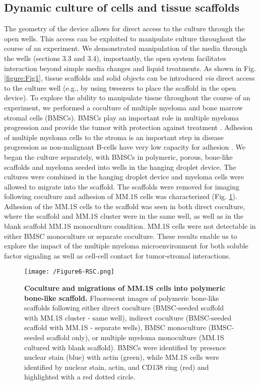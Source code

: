 \subsection{Dynamic culture of cells and tissue scaffolds}
The geometry of the device allows for direct access to the culture through the open wells. This access can be exploited to manipulate culture throughout the course of an experiment. We demonstrated manipulation of the media through the wells (sections 3.3 and 3.4), importantly, the open system facilitates interaction beyond simple media changes and liquid treatments. As shown in Fig. \ref{figure:Fig1}, tissue scaffolds and solid objects can be introduced \textit{via} direct access to the culture well (e.g., by using tweezers to place the scaffold in the open device). To explore the ability to manipulate tissue throughout the course of an experiment, we performed a coculture of multiple myeloma and bone marrow stromal cells (BMSCs). BMSCs play an important role in multiple myeloma progression and provide the tumor with protection against treatment \cite{Chauhan1996, Chatterjee2002a}. Adhesion of multiple myeloma cells to the stroma is an important step in disease progression as non-malignant B-cells have very low capacity for adhesion \cite{Tai2006}.
We began the culture separately, with BMSCs in polymeric, porous, bone-like scaffolds and myeloma seeded into wells in the hanging droplet device. The cultures were combined in the hanging droplet device and myeloma cells were allowed to migrate into the scaffold. The scaffolds were removed for imaging following coculture and adhesion of MM.1S cells was characterized (Fig. \ref{figure:Fig6}). Adhesion of the MM.1S cells to the scaffold was seen in both direct coculture, where the scaffold and MM.1S cluster were in the same well, as well as in the blank scaffold MM.1S monoculture condition. MM.1S cells were not detectable in either BMSC monoculture or separate coculture. These results enable us to explore the impact of the multiple myeloma microenvironment for both soluble factor signaling as well as cell-cell contact for tumor-stromal interactions. 

\begin{figure}[ht] %
\centering
\texttt{[image: /Figure6-RSC.png]}
\caption{\textbf{Coculture and migrations of MM.1S cells into polymeric bone-like scaffold.} Fluorescent images of polymeric bone-like scaffolds following either direct coculture (BMSC-seeded scaffold with MM.1S cluster - same well), indirect coculture (BMSC-seeded scaffold with MM.1S - separate wells), BMSC monoculture (BMSC-seeded scaffold only), or multiple myeloma monoculture (MM.1S cultured with blank scaffold). BMSCs were identified by presence nuclear stain (blue) with actin (green), while MM.1S cells were identified by nuclear stain, actin, and CD138 ring (red) and highlighted with a red dotted circle.}
\label{figure:Fig6}
\end{figure}



